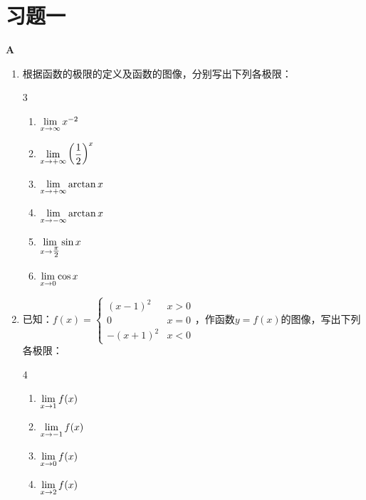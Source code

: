 \section*{习题一}
\begin{center}
\bfseries A
\end{center}

\begin{enumerate}
    \item 根据函数的极限的定义及函数的图像，分别写出下列各极限：
\begin{multicols}{3}
\begin{enumerate}[(1)]
    \item $\lim\limits_{x\to \infty}x^{-2}$
    \item $\lim\limits_{x\to +\infty}\left(\dfrac{1}{2}\right)^x$
    \item $\lim\limits_{x\to +\infty}\arctan x$
    \item $\lim\limits_{x\to -\infty}\arctan x$
    \item $\lim\limits_{x\to \tfrac{\pi}{2}}\sin x$
    \item $\lim\limits_{x\to 0} \cos x$
\end{enumerate}
\end{multicols}

\item 已知：$f(x)=\begin{cases}
    (x-1)^2 & x>0\\
    0& x=0\\
    -(x+1)^2 & x<0
\end{cases}$，作函数$y=f(x)$的图像，写出下列各极限：
\begin{multicols}{4}
\begin{enumerate}[(1)]
    \item $\lim\limits_{x\to 1}f(x)$
    \item $\lim\limits_{x\to -1}f(x)$
    \item $\lim\limits_{x\to 0}f(x)$
    \item $\lim\limits_{x\to 2}f(x)$
\end{enumerate}
\end{multicols}


\end{enumerate}
